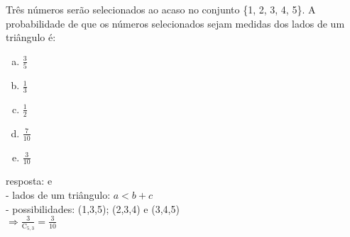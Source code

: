 \begin{ex}
 Três números serão selecionados ao acaso no conjunto \{1, 2,  3, 4, 5\}. A probabilidade de que os números selecionados sejam medidas dos lados de um triângulo é:
    \begin{enumerate}[(a)]
    \item $\frac{3}{5}$
    \item $\frac{1}{3}$
    \item $\frac{1}{2}$
    \item  $\frac{7}{10}$
    \item $\frac{3}{10}$
    \end{enumerate}
      \begin{sol}
        resposta: e \\
        - lados de um triângulo: $a<b+c$ \\
        - possibilidades: (1,3,5); (2,3,4) e (3,4,5) \\
        $\Longrightarrow \frac{3}{\mathrm{C}_{5,3}}=\frac{3}{10}$
      \end{sol}
\end{ex}